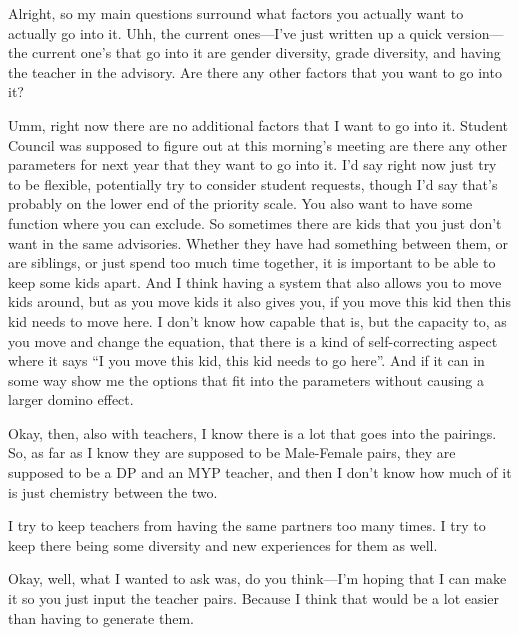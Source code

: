 \documentclass[appendix.tex]{subfiles}
\begin{document}
\begin{interviewer}
Alright, so my main questions surround what factors you actually want to actually go into it.
Uhh, the current ones---I've just written up a quick version---the current one's that go into it are gender diversity, grade diversity, and having the teacher in the advisory.
Are there any other factors that you want to go into it?
\end{interviewer}

\begin{client}
Umm, right now there are no additional factors that I want to go into it.
Student Council was supposed to figure out at this morning's meeting are there any other parameters for next year that they want to go into it.
I'd say right now just try to be flexible, potentially try to consider student requests, though I'd say that's probably on the lower end of the priority scale.
You also want to have some function where you can exclude.
So sometimes there are kids that you just don't want in the same advisories.
Whether they have had something between them, or are siblings, or just spend too much time together, it is important to be able to keep some kids apart.
And I think having a system that also allows you to move kids around, but as you move kids it also gives you, if you move this kid then this kid needs to move here.
I don't know how capable that is, but the capacity to, as you move and change the equation, that there is a kind of self-correcting aspect where it says \enquote{I you move this kid, this kid needs to go here}.
And if it can in some way show me the options that fit into the parameters without causing a larger domino effect.
\end{client}

\begin{interviewer}
Okay, then, also with teachers, I know there is a lot that goes into the pairings.
So, as far as I know they are supposed to be Male-Female pairs, they are supposed to be a DP and an MYP teacher, and then I don't know how much of it is just chemistry between the two.
\end{interviewer}

\begin{client}
I try to keep teachers from having the same partners too many times.
I try to keep there being some diversity and new experiences for them as well.
\end{client}

\begin{interviewer}
Okay, well, what I wanted to ask was, do you think---I'm hoping that I can make it so you just input the teacher pairs.
Because I think that would be a lot easier than having to generate them.
\end{interviewer}
\end{document}
